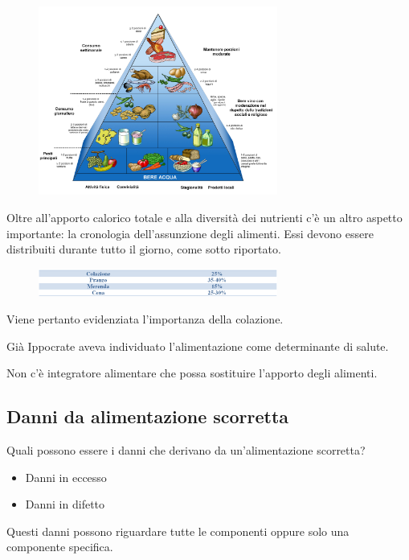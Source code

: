 \begin{figure}[!ht]
\centering
	\includegraphics[width=0.7\textwidth]{20/image8.png}
	\end{figure}

Oltre all'apporto calorico totale e alla diversità dei nutrienti c'è un
altro aspetto importante: la cronologia dell'assunzione degli alimenti.
Essi devono essere distribuiti durante tutto il giorno, come sotto
riportato.

\begin{figure}[!ht]
\centering
	\includegraphics[width=0.7\textwidth]{20/image9.png}
	\end{figure}

Viene pertanto evidenziata l'importanza della colazione.

Già Ippocrate aveva individuato l'alimentazione come determinante di
salute.

Non c'è integratore alimentare che possa sostituire l'apporto degli
alimenti.

\subsection{Danni da alimentazione scorretta}

Quali possono essere i danni che derivano da un'alimentazione scorretta?

\begin{itemize}
\item
  Danni in eccesso
\item
  Danni in difetto
\end{itemize}

Questi danni possono riguardare tutte le componenti oppure solo una
componente specifica.

